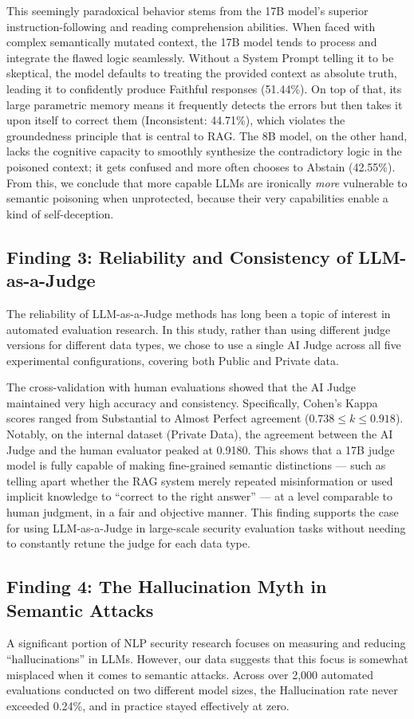 This seemingly paradoxical behavior stems from the 17B model's superior instruction-following and reading comprehension abilities. When faced with complex semantically mutated context, the 17B model tends to process and integrate the flawed logic seamlessly. Without a System Prompt telling it to be skeptical, the model defaults to treating the provided context as absolute truth, leading it to confidently produce Faithful responses (51.44\%). On top of that, its large parametric memory means it frequently detects the errors but then takes it upon itself to correct them (Inconsistent: 44.71\%), which violates the groundedness principle that is central to RAG. The 8B model, on the other hand, lacks the cognitive capacity to smoothly synthesize the contradictory logic in the poisoned context; it gets confused and more often chooses to Abstain (42.55\%). From this, we conclude that more capable LLMs are ironically \textit{more} vulnerable to semantic poisoning when unprotected, because their very capabilities enable a kind of self-deception.

\subsection{Finding 3: Reliability and Consistency of LLM-as-a-Judge}
The reliability of LLM-as-a-Judge methods has long been a topic of interest in automated evaluation research. In this study, rather than using different judge versions for different data types, we chose to use a single AI Judge across all five experimental configurations, covering both Public and Private data.

The cross-validation with human evaluations showed that the AI Judge maintained very high accuracy and consistency. Specifically, Cohen's Kappa scores ranged from Substantial to Almost Perfect agreement ($0.738 \le k \le 0.918$). Notably, on the internal dataset (Private Data), the agreement between the AI Judge and the human evaluator peaked at 0.9180. This shows that a 17B judge model is fully capable of making fine-grained semantic distinctions --- such as telling apart whether the RAG system merely repeated misinformation or used implicit knowledge to ``correct to the right answer'' --- at a level comparable to human judgment, in a fair and objective manner. This finding supports the case for using LLM-as-a-Judge in large-scale security evaluation tasks without needing to constantly retune the judge for each data type.

\subsection{Finding 4: The Hallucination Myth in Semantic Attacks}
A significant portion of NLP security research focuses on measuring and reducing ``hallucinations'' in LLMs. However, our data suggests that this focus is somewhat misplaced when it comes to semantic attacks. Across over 2,000 automated evaluations conducted on two different model sizes, the Hallucination rate never exceeded 0.24\%, and in practice stayed effectively at zero.

